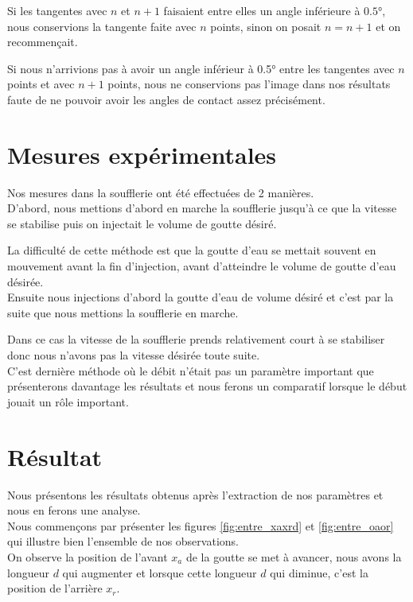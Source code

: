 Si les tangentes avec $n$ et $n+1$ faisaient entre elles un angle inférieure à $\ang{0.5}$, nous conservions la tangente faite avec $n$ points, sinon on posait $n = n+1$ et on recommençait.

Si nous n'arrivions pas à avoir un angle inférieur à \ang{0.5}  entre les tangentes avec $n$ points et avec $n+1$ points, nous ne conservions pas l'image dans nos résultats faute de ne pouvoir avoir les angles de contact assez précisément.

\section{Mesures expérimentales}

Nos mesures dans la soufflerie ont été effectuées de 2 manières.\\

D'abord, nous mettions d'abord en marche la soufflerie jusqu'à ce que la vitesse se stabilise puis on injectait le volume de goutte désiré.

La difficulté de cette méthode est que la goutte d'eau se mettait souvent en mouvement avant la fin d'injection, avant d'atteindre le volume de goutte d'eau désirée.\\

Ensuite nous injections d'abord la goutte d'eau de volume désiré et c'est par la suite que nous mettions la soufflerie en marche.

Dans ce cas la vitesse de la soufflerie prends relativement court à se stabiliser donc nous n'avons pas la vitesse désirée toute suite.\\

C'est dernière méthode où le débit n'était pas un paramètre important que présenterons davantage les résultats et nous ferons un comparatif lorsque le début jouait un rôle important.
\newpage
\section{Résultat}

Nous présentons les résultats obtenus après l'extraction de nos paramètres et nous en ferons une analyse.\\
Nous commençons par présenter les figures \ref{fig:entre_xaxrd} et \ref{fig:entre_oaor} qui illustre bien l'ensemble de nos observations.\\

On observe la position de l'avant $x_{a}$ de la goutte se met à avancer, nous avons la longueur $d$ qui augmenter et lorsque cette longueur $d$ qui diminue, c'est la position de l'arrière $x_{r}$.

